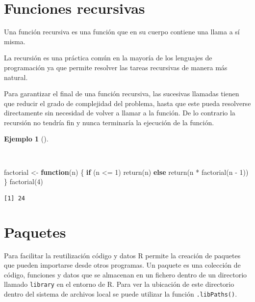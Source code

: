 \documentclass[
  spanish,
  a4paper,
]{scrreport}
\newenvironment{Shaded}{\begin{snugshade}}{\end{snugshade}}
\newcommand{\ControlFlowTok}[1]{\textcolor[rgb]{0.00,0.23,0.31}{\textbf{#1}}}
\newcommand{\DecValTok}[1]{\textcolor[rgb]{0.68,0.00,0.00}{#1}}
\newcommand{\FunctionTok}[1]{\textcolor[rgb]{0.28,0.35,0.67}{#1}}
\newcommand{\NormalTok}[1]{\textcolor[rgb]{0.00,0.23,0.31}{#1}}
\newcommand{\OtherTok}[1]{\textcolor[rgb]{0.00,0.23,0.31}{#1}}
\newcommand{\SpecialCharTok}[1]{\textcolor[rgb]{0.37,0.37,0.37}{#1}}
\theoremstyle{definition}
\theoremstyle{definition}
\newtheorem{example}{Ejemplo}[chapter]
\theoremstyle{remark}
\begin{document}
\section{Funciones recursivas}\label{funciones-recursivas}

Una función recursiva es una función que en su cuerpo contiene una llama
a sí misma.

La recursión es una práctica común en la mayoría de los lenguajes de
programación ya que permite resolver las tareas recursivas de manera más
natural.

Para garantizar el final de una función recursiva, las sucesivas
llamadas tienen que reducir el grado de complejidad del problema, hasta
que este pueda resolverse directamente sin necesidad de volver a llamar
a la función. De lo contrario la recursión no tendría fin y nunca
terminaría la ejecución de la función.

\begin{example}[]\protect\hypertarget{exm-funcion-recursiva}{}\label{exm-funcion-recursiva}

~

\begin{Shaded}
\begin{Highlighting}[]
\NormalTok{factorial }\OtherTok{\textless{}{-}} \ControlFlowTok{function}\NormalTok{(n) \{}
  \ControlFlowTok{if}\NormalTok{ (n }\SpecialCharTok{\textless{}=} \DecValTok{1}\NormalTok{) }\FunctionTok{return}\NormalTok{(n)}
  \ControlFlowTok{else} \FunctionTok{return}\NormalTok{(n }\SpecialCharTok{*} \FunctionTok{factorial}\NormalTok{(n }\SpecialCharTok{{-}} \DecValTok{1}\NormalTok{))}
\NormalTok{\}}
\FunctionTok{factorial}\NormalTok{(}\DecValTok{4}\NormalTok{)}
\end{Highlighting}
\end{Shaded}

\begin{verbatim}
[1] 24
\end{verbatim}

\end{example}

\section{Paquetes}\label{paquetes}

Para facilitar la reutilización código y datos R permite la creación de
paquetes que pueden importarse desde otros programas. Un paquete es una
colección de código, funciones y datos que se almacenan en un fichero
dentro de un directorio llamado \texttt{library} en el entorno de R.
Para ver la ubicación de este directorio dentro del sistema de archivos
local se puede utilizar la función \texttt{.libPaths()}.
\end{document}
